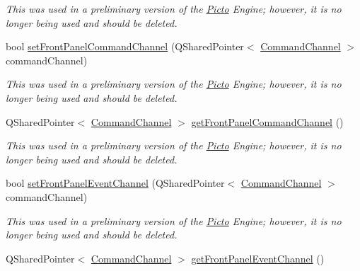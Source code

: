 \begin{DoxyCompactItemize}
\begin{DoxyCompactList}\small\item\em This was used in a preliminary version of the \hyperlink{namespace_picto}{Picto} Engine; however, it is no longer being used and should be deleted. \end{DoxyCompactList}\item 
\hypertarget{class_picto_1_1_engine_1_1_picto_engine_a2ca78a5787786f26c3809aab5759bd16}{bool \hyperlink{class_picto_1_1_engine_1_1_picto_engine_a2ca78a5787786f26c3809aab5759bd16}{set\-Front\-Panel\-Command\-Channel} (Q\-Shared\-Pointer$<$ \hyperlink{class_picto_1_1_command_channel}{Command\-Channel} $>$ command\-Channel)}\label{class_picto_1_1_engine_1_1_picto_engine_a2ca78a5787786f26c3809aab5759bd16}

\begin{DoxyCompactList}\small\item\em This was used in a preliminary version of the \hyperlink{namespace_picto}{Picto} Engine; however, it is no longer being used and should be deleted. \end{DoxyCompactList}\item 
\hypertarget{class_picto_1_1_engine_1_1_picto_engine_a17cfc64c27ddf145839fc8fe3b0cd51f}{Q\-Shared\-Pointer$<$ \hyperlink{class_picto_1_1_command_channel}{Command\-Channel} $>$ \hyperlink{class_picto_1_1_engine_1_1_picto_engine_a17cfc64c27ddf145839fc8fe3b0cd51f}{get\-Front\-Panel\-Command\-Channel} ()}\label{class_picto_1_1_engine_1_1_picto_engine_a17cfc64c27ddf145839fc8fe3b0cd51f}

\begin{DoxyCompactList}\small\item\em This was used in a preliminary version of the \hyperlink{namespace_picto}{Picto} Engine; however, it is no longer being used and should be deleted. \end{DoxyCompactList}\item 
\hypertarget{class_picto_1_1_engine_1_1_picto_engine_afed6750c4d91f87fe4493ad384a6fb41}{bool \hyperlink{class_picto_1_1_engine_1_1_picto_engine_afed6750c4d91f87fe4493ad384a6fb41}{set\-Front\-Panel\-Event\-Channel} (Q\-Shared\-Pointer$<$ \hyperlink{class_picto_1_1_command_channel}{Command\-Channel} $>$ command\-Channel)}\label{class_picto_1_1_engine_1_1_picto_engine_afed6750c4d91f87fe4493ad384a6fb41}

\begin{DoxyCompactList}\small\item\em This was used in a preliminary version of the \hyperlink{namespace_picto}{Picto} Engine; however, it is no longer being used and should be deleted. \end{DoxyCompactList}\item 
\hypertarget{class_picto_1_1_engine_1_1_picto_engine_a5946f6e42c68d08413a46dd1792177ac}{Q\-Shared\-Pointer$<$ \hyperlink{class_picto_1_1_command_channel}{Command\-Channel} $>$ \hyperlink{class_picto_1_1_engine_1_1_picto_engine_a5946f6e42c68d08413a46dd1792177ac}{get\-Front\-Panel\-Event\-Channel} ()}\label{class_picto_1_1_engine_1_1_picto_engine_a5946f6e42c68d08413a46dd1792177ac}


\end{DoxyCompactItemize}
